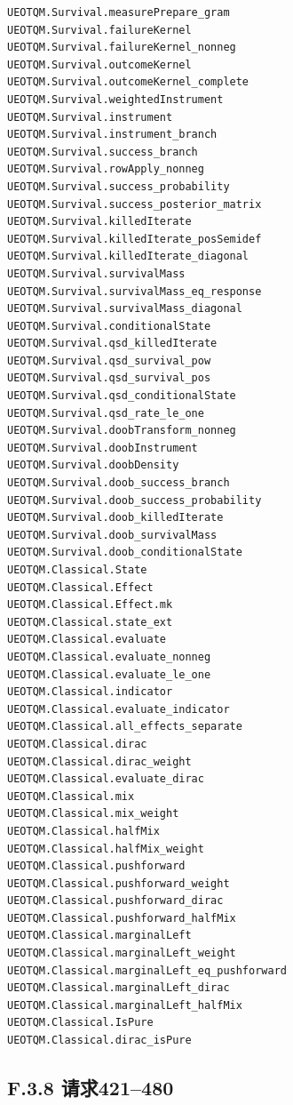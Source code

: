 \documentclass[
  11pt,
  oneside]{book}
\begin{document}
\begin{Verbatim}[breaklines,breakanywhere,fontsize=\scriptsize]
UEOTQM.Survival.measurePrepare_gram
UEOTQM.Survival.failureKernel
UEOTQM.Survival.failureKernel_nonneg
UEOTQM.Survival.outcomeKernel
UEOTQM.Survival.outcomeKernel_complete
UEOTQM.Survival.weightedInstrument
UEOTQM.Survival.instrument
UEOTQM.Survival.instrument_branch
UEOTQM.Survival.success_branch
UEOTQM.Survival.rowApply_nonneg
UEOTQM.Survival.success_probability
UEOTQM.Survival.success_posterior_matrix
UEOTQM.Survival.killedIterate
UEOTQM.Survival.killedIterate_posSemidef
UEOTQM.Survival.killedIterate_diagonal
UEOTQM.Survival.survivalMass
UEOTQM.Survival.survivalMass_eq_response
UEOTQM.Survival.survivalMass_diagonal
UEOTQM.Survival.conditionalState
UEOTQM.Survival.qsd_killedIterate
UEOTQM.Survival.qsd_survival_pow
UEOTQM.Survival.qsd_survival_pos
UEOTQM.Survival.qsd_conditionalState
UEOTQM.Survival.qsd_rate_le_one
UEOTQM.Survival.doobTransform_nonneg
UEOTQM.Survival.doobInstrument
UEOTQM.Survival.doobDensity
UEOTQM.Survival.doob_success_branch
UEOTQM.Survival.doob_success_probability
UEOTQM.Survival.doob_killedIterate
UEOTQM.Survival.doob_survivalMass
UEOTQM.Survival.doob_conditionalState
UEOTQM.Classical.State
UEOTQM.Classical.Effect
UEOTQM.Classical.Effect.mk
UEOTQM.Classical.state_ext
UEOTQM.Classical.evaluate
UEOTQM.Classical.evaluate_nonneg
UEOTQM.Classical.evaluate_le_one
UEOTQM.Classical.indicator
UEOTQM.Classical.evaluate_indicator
UEOTQM.Classical.all_effects_separate
UEOTQM.Classical.dirac
UEOTQM.Classical.dirac_weight
UEOTQM.Classical.evaluate_dirac
UEOTQM.Classical.mix
UEOTQM.Classical.mix_weight
UEOTQM.Classical.halfMix
UEOTQM.Classical.halfMix_weight
UEOTQM.Classical.pushforward
UEOTQM.Classical.pushforward_weight
UEOTQM.Classical.pushforward_dirac
UEOTQM.Classical.pushforward_halfMix
UEOTQM.Classical.marginalLeft
UEOTQM.Classical.marginalLeft_weight
UEOTQM.Classical.marginalLeft_eq_pushforward
UEOTQM.Classical.marginalLeft_dirac
UEOTQM.Classical.marginalLeft_halfMix
UEOTQM.Classical.IsPure
UEOTQM.Classical.dirac_isPure
\end{Verbatim}

\subsection{F.3.8 请求421--480}
\end{document}
